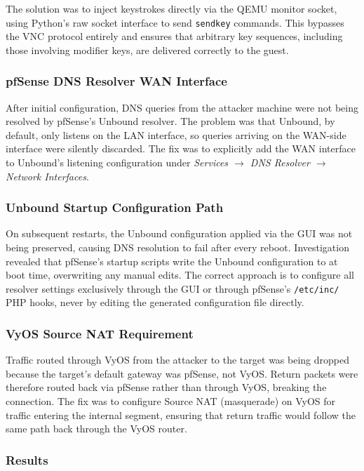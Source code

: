 The solution was to inject keystrokes directly via the QEMU monitor socket,
using Python's raw socket interface to send \texttt{sendkey} commands. This bypasses
the VNC protocol entirely and ensures that arbitrary key sequences, including those
involving modifier keys, are delivered correctly to the guest.

\subsubsection{pfSense DNS Resolver WAN Interface}

After initial configuration, DNS queries from the attacker machine were not being
resolved by pfSense's Unbound resolver. The problem was that Unbound, by default,
only listens on the LAN interface, so queries arriving on the WAN-side interface
were silently discarded. The fix was to explicitly add the WAN interface to
Unbound's listening configuration under \textit{Services $\to$ DNS Resolver $\to$
Network Interfaces}.

\subsubsection{Unbound Startup Configuration Path}

On subsequent restarts, the Unbound configuration applied via the
GUI was not being preserved, causing DNS resolution to fail after every reboot.
Investigation revealed that pfSense's startup scripts write the Unbound configuration
to  at boot time, overwriting any manual edits.
The correct approach is to configure all resolver settings exclusively through the
GUI or through pfSense's \texttt{/etc/inc/} PHP hooks, never by editing the
generated configuration file directly.

\subsubsection{VyOS Source NAT Requirement}

Traffic routed through VyOS from the attacker to the target was being dropped
because the target's default gateway was pfSense, not VyOS. Return packets were
therefore routed back via pfSense rather than through VyOS, breaking the connection.
The fix was to configure Source NAT (masquerade) on VyOS for traffic entering
the internal segment, ensuring that return traffic would follow the same path back
through the VyOS router.

\subsubsection*{Results}

